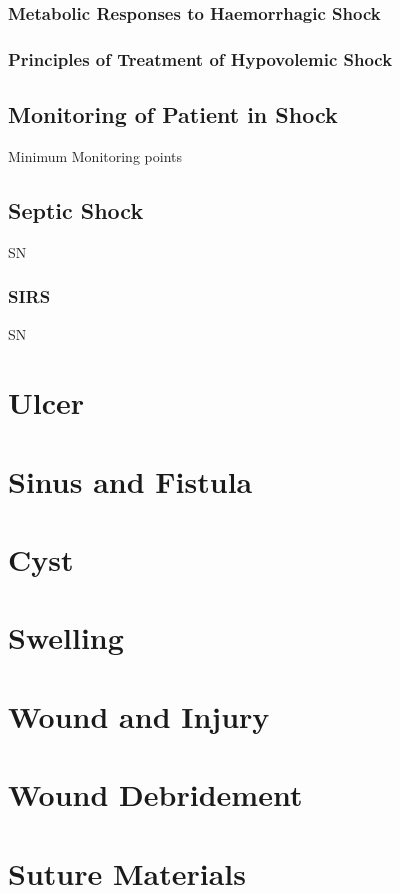 \documentclass[11pt, a4paper]{article}
\begin{document}
\subsubsection{Metabolic Responses to Haemorrhagic Shock}
\subsubsection{Principles of Treatment of Hypovolemic Shock}

\subsection{Monitoring of Patient in Shock}
Minimum Monitoring points

\subsection{Septic Shock}
SN

\subsubsection{SIRS}
SN

\section{Ulcer}

\section{Sinus and Fistula}

\section{Cyst}

\section{Swelling}

\section{Wound and Injury}

\section{Wound Debridement}

\section{Suture Materials}
\end{document}
